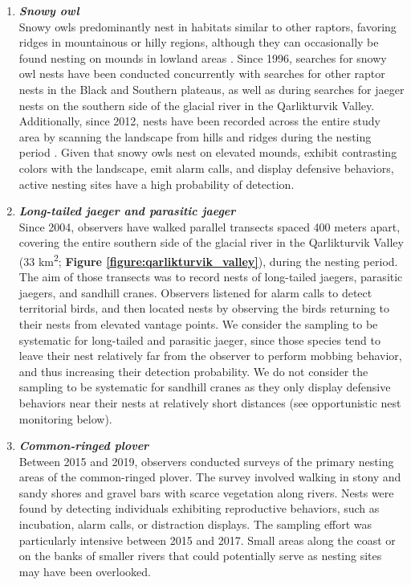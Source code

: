 \documentclass[a4paper,twoside,12pt]{article}
\begin{document}
\begin{enumerate}[label=\roman*]
        \item[] \textit{\textbf{Snowy owl}} \\
        Snowy owls predominantly nest in habitats similar to other raptors, favoring ridges in mountainous or hilly regions, although they can occasionally be found nesting on mounds in lowland areas \citep{seyer2020}. Since 1996, searches for snowy owl nests have been conducted concurrently with searches for other raptor nests in the Black and Southern plateaus, as well as during searches for jaeger nests on the southern side of the glacial river in the Qarlikturvik Valley. Additionally, since 2012, nests have been recorded across the entire study area by scanning the landscape from hills and ridges during the nesting period \citep{duchesne2021}. Given that snowy owls nest on elevated mounds, exhibit contrasting colors with the landscape, emit alarm calls, and display defensive behaviors, active nesting sites have a high probability of detection.
        
        \item[] \textit{\textbf{Long-tailed jaeger and parasitic jaeger}} \\
        Since 2004, observers have walked parallel transects spaced 400 meters apart, covering the entire southern side of the glacial river in the Qarlikturvik Valley (33 km\textsuperscript{2}; \textbf{Figure \ref{figure:qarlikturvik_valley}}), during the nesting period. The aim of those transects was to record nests of long-tailed jaegers, parasitic jaegers, and sandhill cranes. Observers listened for alarm calls to detect territorial birds, and then located nests by observing the birds returning to their nests from elevated vantage points. We consider the sampling to be systematic for long-tailed and parasitic jaeger, since those species tend to leave their nest relatively far from the observer to perform mobbing behavior, and thus increasing their detection probability. We do not consider the sampling to be systematic for sandhill cranes as they only display defensive behaviors near their nests at relatively short distances (see opportunistic nest monitoring below).
        
        \item[] \textit{\textbf{Common-ringed plover}} \\
        Between 2015 and 2019, observers conducted surveys of the primary nesting areas of the common-ringed plover. The survey involved walking in stony and sandy shores and gravel bars with scarce vegetation along rivers. Nests were found by detecting individuals exhibiting reproductive behaviors, such as incubation, alarm calls, or distraction displays. The sampling effort was particularly intensive between 2015 and 2017. Small areas along the coast or on the banks of smaller rivers that could potentially serve as nesting sites may have been overlooked.
        

\end{enumerate}
\end{document}
